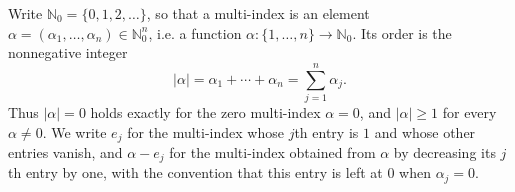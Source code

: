 \begin{definition}
Write $\mathbb{N}_0 = \{0,1,2,\ldots\}$, so that a multi-index is an element
$\alpha = (\alpha_1,\ldots,\alpha_n) \in \mathbb{N}_0^n$, i.e. a function
$\alpha : \{1,\ldots,n\} \to \mathbb{N}_0$.  Its order is the nonnegative integer
\[
  |\alpha| = \alpha_1 + \cdots + \alpha_n = \sum_{j=1}^n \alpha_j .
\]
Thus $|\alpha| = 0$ holds exactly for the zero multi-index $\alpha = 0$, and
$|\alpha| \geq 1$ for every $\alpha \neq 0$.  We write $e_j$ for the multi-index
whose $j$th entry is $1$ and whose other entries vanish, and $\alpha - e_j$ for
the multi-index obtained from $\alpha$ by decreasing its $j$th entry by one,
with the convention that this entry is left at $0$ when $\alpha_j = 0$.
\end{definition}

